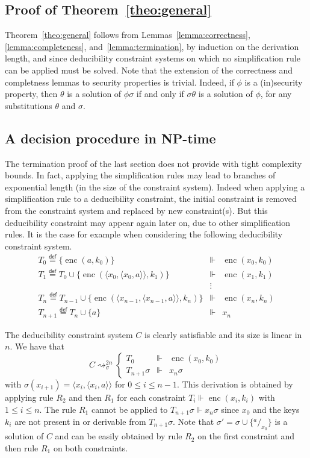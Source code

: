 \documentclass[acmtocl,acmnow]{acmtrans2m}
\newcommand{\subst}[2]{{}^{#2}\!/_{\!#1}}
\newcommand{\enc}{\operatorname{enc}}
\newcommand{\eqdef}{\stackrel{\mathsf{def}}{=}}
\newcommand{\simpl}{\rightsquigarrow}   \newcommand{\msimpl}{\rightsquigarrow}  \newcommand{\gsimpl}{\leadsto}
\newcommand{\dedcons}[1]{deducibility constraint}
\newcommand{\dedsys}[1]{deducibility constraint system}
\newcommand{\dedsyss}[1]{deducibility constraint systems}
\begin{document}
\subsection{Proof of Theorem~\ref{theo:general}}
\label{section:th-proof}

Theorem~\ref{theo:general} follows from Lemmas~\ref{lemma:correctness},
\ref{lemma:completeness}, and~\ref{lemma:termination}, by induction on the derivation length, and since \dedsyss{} on
which no simplification rule can be applied must be solved. 
Note that the extension of the correctness and completness lemmas to
security properties is trivial. Indeed, if $\phi$ is a (in)security
property, then $\theta$ is a solution of $\phi\sigma$ if and only if
$\sigma\theta$ is a solution of $\phi$, for any substitutions $\theta$
and $\sigma$.


\subsection{A decision procedure in NP-time}\label{sec:poly}
\label{section:complexity}


The termination proof of the last section does not provide with tight complexity bounds.
In fact, applying the simplification rules may lead to
branches of exponential length (in the size of the constraint system).
Indeed when applying a simplification
rule to a \dedcons{}, the initial constraint is removed from the
constraint system and replaced by new constraint(s). But this
\dedcons{} may appear again later on, due to other simplification
rules. It is the case for example when considering the
following \dedsys{}.
\begin{eqnarray*}
T_0 \eqdef \{\enc(a,k_0)\} & \Vdash & \enc(x_0, k_0)\\
T_1 \eqdef T_0\cup\{\enc(\langle x_0,\langle x_0,a\rangle\rangle,k_1)\}
& \Vdash & \enc(x_1,k_1)\\
&\vdots &\\
T_n \eqdef T_{n-1}\cup\{\enc(\langle x_{n-1},\langle
x_{n-1},a\rangle\rangle,k_n)\}
& \Vdash & \enc(x_n,k_n)\\
T_{n+1} \eqdef T_n\cup\{a\} & \Vdash & x_n
\end{eqnarray*}

The \dedsys{} $C$ is clearly satisfiable
and its size is linear in $n$.
We have that
\[
C\simpl^{2n}_{\sigma}
\left\{\begin{array}{rcl}
T_0&\Vdash &\enc(x_0, k_0)\\
T_{n+1}\sigma & \Vdash & x_n\sigma\end{array}\right.
\]
with $\sigma(x_{i+1}) = \langle x_i,\langle x_i,a\rangle\rangle$ for
$0\leq i\leq n-1$. This derivation is obtained by applying rule $R_2$ and then $R_1$ for each constraint
$T_i\Vdash \enc(x_i,k_i)$ with $1\leq i\leq n$.
The rule $R_1$ cannot be applied to $T_{n+1}\sigma  \Vdash  x_n\sigma$
since $x_0$ and the keys $k_i$ are not present in or derivable from $T_{n+1}\sigma$.
Note that $\sigma'= \sigma\cup \{\subst{x_0}{a}\}$ is a
solution of $C$ and can be easily obtained by rule $R_2$ on the first constraint and then rule $R_1$ on both
constraints.
\end{document}
